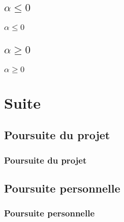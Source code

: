 \documentclass{beamer}
\begin{document}
\subsection{$\alpha \leq 0$}
\begin{frame}
\frametitle{$\alpha \leq 0$}
\end{frame}

\subsection{$\alpha \geq 0$}
\begin{frame}
\frametitle{$\alpha \geq 0$}
\end{frame}

\section{Suite}

\subsection{Poursuite du projet}
\begin{frame}
\frametitle{Poursuite du projet}
\end{frame}

\subsection{Poursuite personnelle}
\begin{frame}
\frametitle{Poursuite personnelle}
\end{frame}

\end{document}
